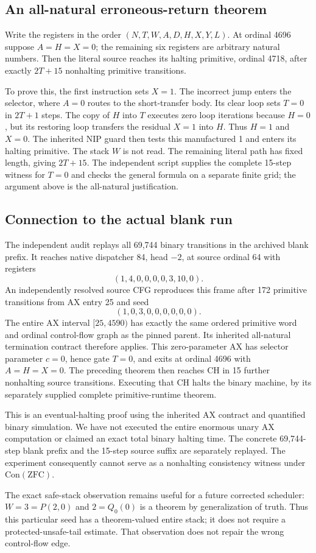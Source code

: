 \subsection{An all-natural erroneous-return theorem}
Write the registers in the order
$(N,T,W,A,D,H,X,Y,L)$.  At ordinal 4696 suppose $A=H=X=0$;
the remaining six registers are arbitrary natural numbers.  Then the literal
source reaches its halting primitive, ordinal 4718, after exactly
$2T+15$ nonhalting primitive transitions.

To prove this, the first instruction sets $X=1$.  The incorrect jump enters
the selector, where $A=0$ routes to the short-transfer body.  Its clear loop
sets $T=0$ in $2T+1$ steps.  The copy of $H$ into $T$ executes zero loop
iterations because $H=0$, but its restoring loop transfers the residual
$X=1$ into $H$.  Thus $H=1$ and $X=0$.  The inherited NIP guard then tests
this manufactured 1 and enters its halting primitive.  The stack $W$ is not
read.  The remaining literal path has fixed length, giving $2T+15$.
The independent script supplies the complete 15-step witness for $T=0$ and
checks the general formula on a separate finite grid; the argument above is
the all-natural justification.

\subsection{Connection to the actual blank run}
The independent audit replays all 69,744 binary transitions in the archived
blank prefix.  It reaches native dispatcher 84, head $-2$, at source ordinal
64 with registers
\[
 (1,4,0,0,0,0,3,10,0).
\]
An independently resolved source CFG reproduces this frame after 172
primitive transitions from AX entry 25 and seed
\[
 (1,0,3,0,0,0,0,0,0).
\]
The entire AX interval $[25,4590)$ has exactly the same ordered primitive
word and ordinal control-flow graph as the pinned parent.  Its inherited
all-natural termination contract therefore applies.  This zero-parameter
AX has selector parameter $c=0$, hence gate $T=0$, and exits at ordinal 4696
with $A=H=X=0$.
The preceding theorem then reaches CH in 15 further nonhalting source
transitions.  Executing that CH halts the binary machine, by its separately
supplied complete primitive-runtime theorem.

This is an eventual-halting proof using the inherited AX contract and
quantified binary simulation.  We have not executed the entire enormous
unary AX computation or claimed an exact total binary halting time.
The concrete 69,744-step blank prefix and the 15-step source suffix are
separately replayed.  The experiment consequently cannot serve as a
nonhalting consistency witness under $\mathrm{Con}(\mathrm{ZFC})$.

The exact safe-stack observation remains useful for a future corrected
scheduler: $W=3=P(2,0)$ and $2=Q_0(0)$ is a theorem by generalization of
truth.  Thus this particular seed has a theorem-valued entire stack; it
does not require a protected-unsafe-tail estimate.  That observation does
not repair the wrong control-flow edge.
